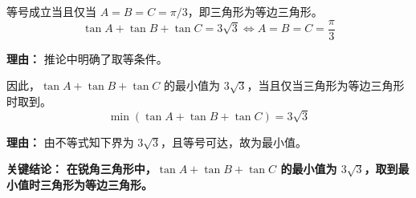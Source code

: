 \begin{examplebox}
\begin{description}[style=nextline, leftmargin=2.8em, labelsep=0.5em, itemsep=0.45em]
    \item[\textbf{第二步（验证等号）：}] 等号成立当且仅当 $A = B = C = \pi/3$，即三角形为等边三角形。
    \[
    \tan A + \tan B + \tan C = 3\sqrt{3} \iff A=B=C=\frac{\pi}{3}
    \]
    \par\textbf{理由：}
    推论中明确了取等条件。

    \item[\textbf{第三步（结论）：}] 因此，$\tan A + \tan B + \tan C$ 的最小值为 $3\sqrt{3}$，当且仅当三角形为等边三角形时取到。
    \[
    \min(\tan A + \tan B + \tan C) = 3\sqrt{3}
    \]
    \par\textbf{理由：}
    由不等式知下界为 $3\sqrt{3}$，且等号可达，故为最小值。
\end{description}

\textbf{\textcolor{CExample}{关键结论：}} \textbf{在锐角三角形中，$\tan A + \tan B + \tan C$ 的最小值为 $3\sqrt{3}$，取到最小值时三角形为等边三角形。}
\end{examplebox}
